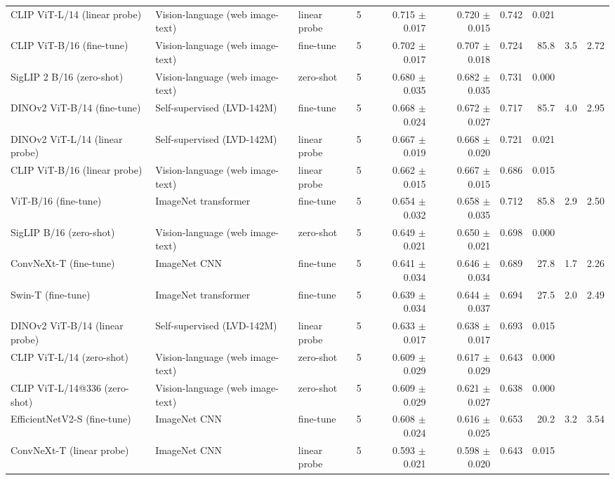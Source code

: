 \begin{table}[t]
\begin{tabular}{llllrrrrrr}
CLIP ViT-L/14 (linear probe) & Vision-language (web image-text) & linear probe & 5 & 0.715 $\pm$ 0.017 & 0.720 $\pm$ 0.015 & 0.742 & 0.021 &  &  \\
CLIP ViT-B/16 (fine-tune) & Vision-language (web image-text) & fine-tune & 5 & 0.702 $\pm$ 0.017 & 0.707 $\pm$ 0.018 & 0.724 & 85.8 & 3.5 & 2.72 \\
SigLIP 2 B/16 (zero-shot) & Vision-language (web image-text) & zero-shot & 5 & 0.680 $\pm$ 0.035 & 0.682 $\pm$ 0.035 & 0.731 & 0.000 &  &  \\
DINOv2 ViT-B/14 (fine-tune) & Self-supervised (LVD-142M) & fine-tune & 5 & 0.668 $\pm$ 0.024 & 0.672 $\pm$ 0.027 & 0.717 & 85.7 & 4.0 & 2.95 \\
DINOv2 ViT-L/14 (linear probe) & Self-supervised (LVD-142M) & linear probe & 5 & 0.667 $\pm$ 0.019 & 0.668 $\pm$ 0.020 & 0.721 & 0.021 &  &  \\
CLIP ViT-B/16 (linear probe) & Vision-language (web image-text) & linear probe & 5 & 0.662 $\pm$ 0.015 & 0.667 $\pm$ 0.015 & 0.686 & 0.015 &  &  \\
ViT-B/16 (fine-tune) & ImageNet transformer & fine-tune & 5 & 0.654 $\pm$ 0.032 & 0.658 $\pm$ 0.035 & 0.712 & 85.8 & 2.9 & 2.50 \\
SigLIP B/16 (zero-shot) & Vision-language (web image-text) & zero-shot & 5 & 0.649 $\pm$ 0.021 & 0.650 $\pm$ 0.021 & 0.698 & 0.000 &  &  \\
ConvNeXt-T (fine-tune) & ImageNet CNN & fine-tune & 5 & 0.641 $\pm$ 0.034 & 0.646 $\pm$ 0.034 & 0.689 & 27.8 & 1.7 & 2.26 \\
Swin-T (fine-tune) & ImageNet transformer & fine-tune & 5 & 0.639 $\pm$ 0.034 & 0.644 $\pm$ 0.037 & 0.694 & 27.5 & 2.0 & 2.49 \\
DINOv2 ViT-B/14 (linear probe) & Self-supervised (LVD-142M) & linear probe & 5 & 0.633 $\pm$ 0.017 & 0.638 $\pm$ 0.017 & 0.693 & 0.015 &  &  \\
CLIP ViT-L/14 (zero-shot) & Vision-language (web image-text) & zero-shot & 5 & 0.609 $\pm$ 0.029 & 0.617 $\pm$ 0.029 & 0.643 & 0.000 &  &  \\
CLIP ViT-L/14@336 (zero-shot) & Vision-language (web image-text) & zero-shot & 5 & 0.609 $\pm$ 0.029 & 0.621 $\pm$ 0.027 & 0.638 & 0.000 &  &  \\
EfficientNetV2-S (fine-tune) & ImageNet CNN & fine-tune & 5 & 0.608 $\pm$ 0.024 & 0.616 $\pm$ 0.025 & 0.653 & 20.2 & 3.2 & 3.54 \\
ConvNeXt-T (linear probe) & ImageNet CNN & linear probe & 5 & 0.593 $\pm$ 0.021 & 0.598 $\pm$ 0.020 & 0.643 & 0.015 &  &  \\

\end{tabular}
\end{table}
